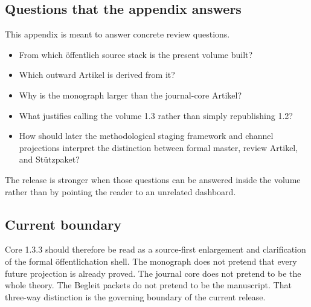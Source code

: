 \subsection{Questions that the appendix answers}

This appendix is meant to answer concrete review questions.

\begin{itemize}
\item From which öffentlich source stack is the present volume built?
\item Which outward Artikel is derived from it?
\item Why is the monograph larger than the journal-core Artikel?
\item What justifies calling the volume 1.3 rather than simply republishing 1.2?
\item How should later the methodological staging framework and channel projections interpret the distinction between formal
      master, review Artikel, and Stützpaket?
\end{itemize}

The release is stronger when those questions can be answered inside the volume rather than by
pointing the reader to an unrelated dashboard.

\subsection{Current boundary}

Core 1.3.3 should therefore be read as a source-first enlargement and clarification of the formal
öffentlichation shell.
The monograph does not pretend that every future projection is already proved.
The journal core does not pretend to be the whole theory.
The Begleit packets do not pretend to be the manuscript.
That three-way distinction is the governing boundary of the current release.

\clearpage
